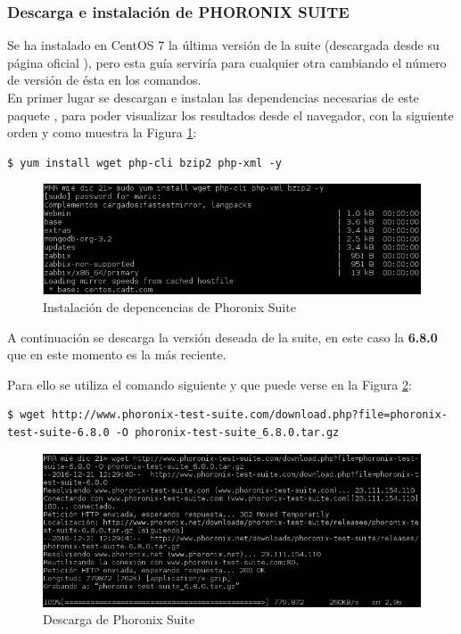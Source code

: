 \subsubsection{Descarga e instalación de PHORONIX SUITE}

Se ha instalado en CentOS 7 la última versión de la suite (descargada desde su página oficial \cite{enlace2}), pero esta guía serviría para cualquier otra cambiando el número de versión de ésta en los comandos.
\\
\vspace{-3.8pt}
En primer lugar se descargan e instalan las dependencias necesarias de este paquete \cite{enlace1}, para poder visualizar los resultados desde el navegador, con la siguiente orden y como muestra la Figura \ref{fig:figura1-1}:
\begin{lstlisting}[style=fich]
$ yum install wget php-cli bzip2 php-xml -y
\end{lstlisting}
\vspace{-28pt}
\begin{figure}[H] %
	\centering
	\includegraphics[scale=0.8]{figuras/ejercicio1/figura1-1.png} 
	\caption{Instalación de depencencias de Phoronix Suite} 
	\label{fig:figura1-1}
\end{figure}
\vspace{-11pt}
A continuación se descarga la versión deseada de la suite, en este caso la \textbf{6.8.0} que en este momento es la más reciente.

Para ello se utiliza el comando siguiente y que puede verse en la Figura \ref{fig:figura1-2}:

\begin{lstlisting}[style=fich]
$ wget http://www.phoronix-test-suite.com/download.php?file=phoronix-test-suite-6.8.0 -O phoronix-test-suite_6.8.0.tar.gz
\end{lstlisting}
\vspace{-28pt}
\begin{figure}[H] %
	\centering
	\includegraphics[scale=0.7]{figuras/ejercicio1/figura1-2.png} 
	\caption{Descarga de Phoronix Suite} 
	\label{fig:figura1-2}
\end{figure}

